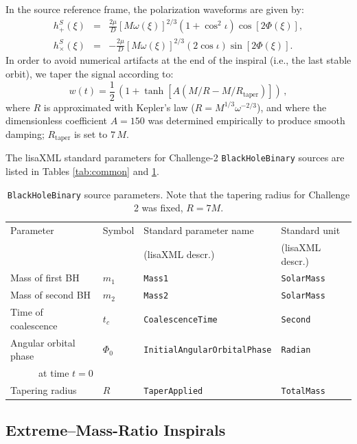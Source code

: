 \documentclass[12pt]{iopart}
\begin{document}
In the source reference frame, the polarization waveforms are given by:
%
\begin{eqnarray}
h^S_{+}(\xi) &=& \frac{2\mu}{D}[M\omega(\xi)]^{2/3}(1+\cos^2 \iota)\cos [2\Phi(\xi)], \\
h^S_{\times}(\xi) &=& -\frac{2\mu}{D}[M\omega(\xi)]^{2/3}(2 \cos \iota) \sin [2\Phi(\xi)]. 
\end{eqnarray}
%
In order to avoid numerical artifacts at the end of the inspiral (i.e., the last stable orbit), we taper the signal according to:
%
\begin{equation}
w(t) = \frac{1}{2}\,\left( 1 + \tanh\left[A (M/R - M/R_\mathrm{taper})\right] \right)\,,
\end{equation}
%
where $R$ is approximated with Kepler's law ($R = M^{1/3} \omega^{-2/3}$), and
where the dimensionless coefficient $A = 150$ was determined empirically to produce smooth damping; $R_\mathrm{taper}$ is set to $7\, M$.

The lisaXML standard parameters for Challenge-2 \texttt{BlackHoleBinary} sources are listed in Tables \ref{tab:common} and \ref{tab:bbh}.
%
\begin{table}
\begin{tabular}{llll}
\hline
{Parameter} &
{Symbol} &
{Standard parameter name} &
{Standard unit} \\
& & (lisaXML descr.) & (lisaXML descr.) \\
\hline
Mass of first BH    & $m_1$  & \texttt{Mass1}           & \texttt{SolarMass} \\
Mass of second BH   & $m_2$  & \texttt{Mass2}           & \texttt{SolarMass} \\
Time of coalescence & $t_c$  & \texttt{CoalescenceTime} & \texttt{Second} \\
Angular orbital phase & $\Phi_0$ & \texttt{InitialAngularOrbitalPhase} & \texttt{Radian} \\
\multicolumn{1}{r}{at time $t = 0$} & & & \\
Tapering radius & $R$    & \texttt{TaperApplied}    & \texttt{TotalMass} \\ 
\hline
\end{tabular}
\caption{\texttt{BlackHoleBinary} source parameters. Note that the tapering radius for Challenge 2 was fixed, $R = 7M$.
\label{tab:bbh}}
\end{table}

\subsection{Extreme--Mass-Ratio Inspirals}
\end{document}
